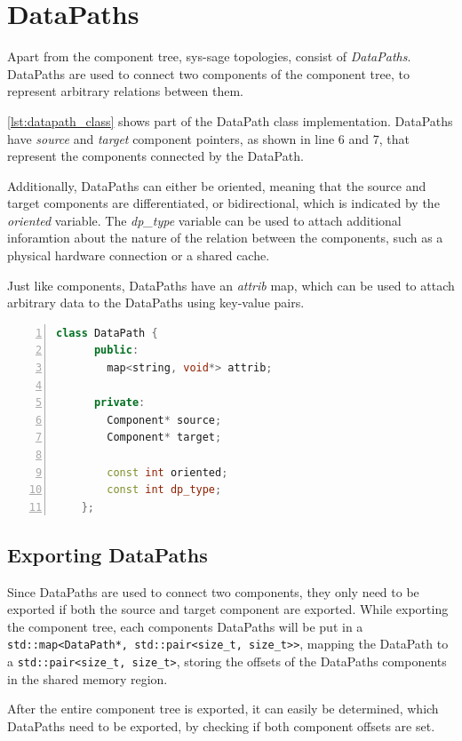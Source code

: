 \section{DataPaths}
Apart from the component tree, sys-sage topologies, consist of \emph{DataPaths}.
DataPaths are used to connect two components of the component tree, to represent arbitrary relations between them.

\autoref{lst:datapath_class} shows part of the DataPath class implementation.
DataPaths have \emph{source} and \emph{target} component pointers, as shown in line 6 and 7, that represent the components connected by the DataPath.

Additionally, DataPaths can either be oriented, meaning that the source and target components are differentiated, or bidirectional, which is indicated by the \emph{oriented} variable.
The \emph{dp\_type} variable can be used to attach additional inforamtion about the nature of the relation between the components, such as a physical hardware connection or a shared cache.

Just like components, DataPaths have an \emph{attrib} map, which can be used to attach arbitrary data to the DataPaths using key-value pairs.

\begin{lstlisting}[language=c++, numbers=left, caption=DataPath Class, captionpos=b, label={lst:datapath_class}]
    class DataPath {
      public:
        map<string, void*> attrib;

      private:
        Component* source;
        Component* target;

        const int oriented;
        const int dp_type;
    };
\end{lstlisting}

\subsection{Exporting DataPaths}\label{subsection:export_dps}
Since DataPaths are used to connect two components, they only need to be exported if both the source and target component are exported. %
While exporting the component tree, each components DataPaths will be put in a \lstinline|std::map<DataPath*, std::pair<size_t, size_t>>|,
mapping the DataPath to a \lstinline|std::pair<size_t, size_t>|, storing the offsets of the DataPaths components in the shared memory region.

After the entire component tree is exported, it can easily be determined, which DataPaths need to be exported, by checking if both component offsets are set.

